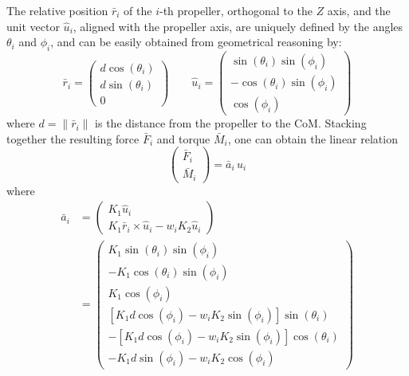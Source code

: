 \documentclass[review]{elsarticle}
\begin{document}
The relative position $\bar{r}_i$ of the $i$-th propeller, orthogonal to the
$Z$ axis, and the unit vector $\hat{u}_i$, aligned with the propeller
axis, are uniquely defined by the angles $\theta_i$ and $\phi_i$, and can be
easily obtained from geometrical reasoning by:
\begin{equation}
  \bar{r}_i = \left(
    \begin{array}{c}
      d\cos(\theta_i) \\
      d\sin(\theta_i) \\
      0
      \end{array}
    \right)
    \qquad
    \hat{u}_i = \left(
      \begin{array}{c}
        \sin(\theta_i)\sin(\phi_i) \\
        -\cos(\theta_i)\sin(\phi_i) \\
        \cos(\phi_i)
      \end{array}
      \right)
\end{equation}
where $d=\|\bar{r}_i\|$ is the distance from the propeller to the CoM.
Stacking together the resulting force $\bar{F}_i$ and torque
$\bar{M}_i$, one can obtain the linear relation
\begin{equation}
  \label{eq:fm}
  \left(
    \begin{array}{c}
      \bar{F}_i \\
      \bar{M}_i
    \end{array}
  \right) = \bar{a}_i\,u_i
\end{equation}
where
\begin{equation}
  \begin{split}
    \bar{a}_i  &= \left(
      \begin{array}{c}
        K_1 \hat{u}_i \\
        K_1 \bar{r}_i \times \hat{u}_i - w_i K_2 \hat{u}_i
      \end{array}
    \right) \\
    &= \left(
      \begin{array}{c}
        K_1 \sin(\theta_i)\sin(\phi_i) \\
        -K_1 \cos(\theta_i)\sin(\phi_i) \\
        K_1 \cos(\phi_i) \\
        \left[K_1 d \cos(\phi_i) - w_i K_2 \sin(\phi_i)\right]\sin(\theta_i) \\
        -\left[K_1 d \cos(\phi_i) - w_i K_2 \sin(\phi_i)\right]\cos(\theta_i) \\
        -K_1 d \sin(\phi_i) - w_i K_2 \cos(\phi_i)
      \end{array}
    \right)
    \end{split}
\end{equation}
\end{document}
